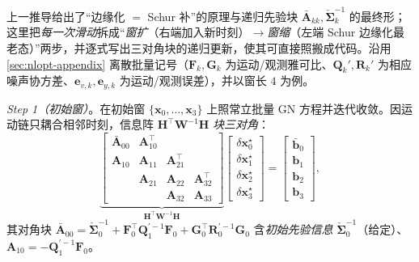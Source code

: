 \begin{derivation}
\label{der:nlopt-swf-recursion}
上一推导给出了“边缘化 $=$ Schur 补”的原理与递归先验块 $\bar{\mathbf{A}}_{kk},\check{\boldsymbol{\Sigma}}_k^{-1}$ 的最终形；这里把\emph{每一次滑动}拆成“\emph{窗扩}（右端加入新时刻）$\to$\emph{窗缩}（左端 Schur 边缘化最老态）”两步，并逐式写出三对角块的递归更新，使其可直接照搬成代码。沿用 \cref{sec:nlopt-appendix} 离散批量记号（$\mathbf{F}_k,\mathbf{G}_k$ 为运动/观测雅可比、$\mathbf{Q}_k',\mathbf{R}_k'$ 为相应噪声协方差、$\mathbf{e}_{v,k},\mathbf{e}_{y,k}$ 为运动/观测误差），并以窗长 $4$ 为例。

\emph{Step 1（初始窗）}。在初始窗 $\{\mathbf{x}_0,\dots,\mathbf{x}_3\}$ 上照常立批量 GN 方程并迭代收敛。因运动链只耦合相邻时刻，信息阵 $\mathbf{H}^\top\mathbf{W}^{-1}\mathbf{H}$ \emph{块三对角}：
\begin{equation}
\underbrace{\begin{bmatrix}
\bar{\mathbf{A}}_{00} & \mathbf{A}_{10}^\top & & \\
\mathbf{A}_{10} & \mathbf{A}_{11} & \mathbf{A}_{21}^\top & \\
 & \mathbf{A}_{21} & \mathbf{A}_{22} & \mathbf{A}_{32}^\top \\
 & & \mathbf{A}_{32} & \mathbf{A}_{33}
\end{bmatrix}}_{\mathbf{H}^\top\mathbf{W}^{-1}\mathbf{H}}
\begin{bmatrix}\delta\mathbf{x}_0^\star\\ \delta\mathbf{x}_1^\star\\ \delta\mathbf{x}_2^\star\\ \delta\mathbf{x}_3^\star\end{bmatrix}
=\begin{bmatrix}\bar{\mathbf{b}}_0\\ \mathbf{b}_1\\ \mathbf{b}_2\\ \mathbf{b}_3\end{bmatrix},
\label{eq:nlopt-swf-init}
\end{equation}
其对角块 $\bar{\mathbf{A}}_{00}=\check{\boldsymbol{\Sigma}}_0^{-1}+\mathbf{F}_0^\top\mathbf{Q}_1^{\prime-1}\mathbf{F}_0+\mathbf{G}_0^\top\mathbf{R}_0^{\prime-1}\mathbf{G}_0$ 含\emph{初始先验信息} $\check{\boldsymbol{\Sigma}}_0^{-1}$（给定）、$\mathbf{A}_{10}=-\mathbf{Q}_1^{\prime-1}\mathbf{F}_0$。


\end{derivation}
